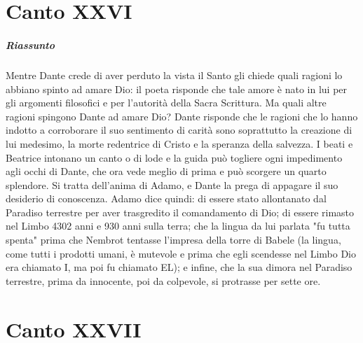 \documentclass[a4paper, twoside, titlepage]{book}
\newcounter{mar}
\begin{document}
\chapter{Canto XXVI}

\paragraph{Riassunto} Mentre Dante crede di aver perduto la vista il Santo gli chiede quali ragioni lo abbiano spinto ad amare Dio: il poeta risponde che tale amore è nato in lui per gli argomenti filosofici e per l’autorità della Sacra Scrittura. Ma quali altre ragioni spingono Dante ad amare Dio? Dante risponde che le ragioni che lo hanno indotto a corroborare il suo sentimento di carità sono soprattutto la creazione di lui medesimo, la morte redentrice di Cristo e la speranza della salvezza. I beati e Beatrice intonano un canto o di lode e la guida può togliere ogni impedimento agli occhi di Dante, che ora vede meglio di prima e può scorgere un quarto splendore. Si tratta dell’anima di Adamo, e Dante la prega di appagare il suo desiderio di conoscenza. Adamo dice quindi: di essere stato allontanato dal Paradiso terrestre per aver trasgredito il comandamento di Dio; di essere rimasto nel Limbo 4302 anni e 930 anni sulla terra; che la lingua da lui parlata "fu tutta spenta" prima che Nembrot tentasse l’impresa della torre di Babele (la lingua, come tutti i prodotti umani, è mutevole e prima che egli scendesse nel Limbo Dio era chiamato I, ma poi fu chiamato EL); e infine, che la sua dimora nel Paradiso terrestre, prima da innocente, poi da colpevole, si protrasse per sette ore.

\chapter{Canto XXVII}
\end{document}
